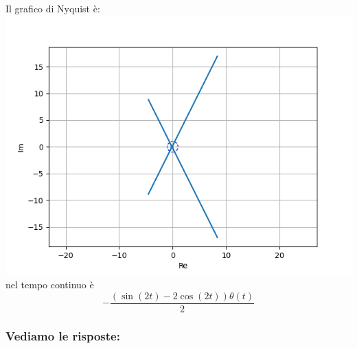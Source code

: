 \documentclass{article}
\begin{document}
Il grafico di Nyquist è:
\includegraphics[scale = 0.5]{figures/nyquist_8601915.png}nel tempo continuo è \[ - \frac{\left(\sin{\left(2 t \right)} - 2 \cos{\left(2 t \right)}\right) \theta\left(t\right)}{2} \]
\subsubsection{Vediamo le risposte:} 
\end{document}
